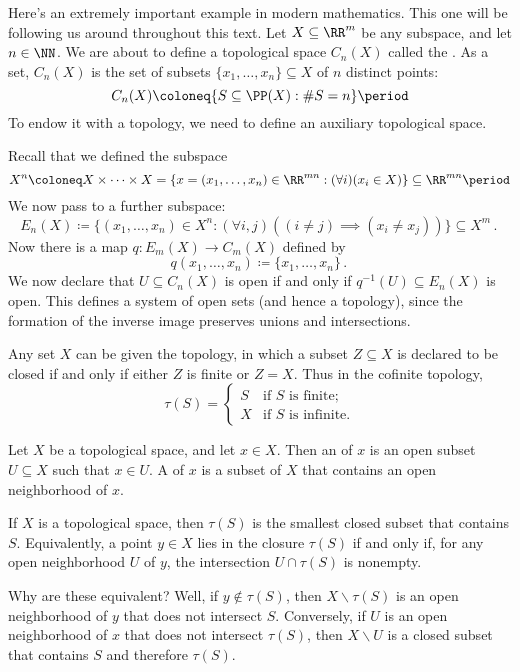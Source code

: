 \begin{exm}
	Here's an extremely important example in modern mathematics.
	This one will be following us around throughout this text.
	Let $X \subseteq \RR^m$ be any subspace, and let $n \in \NN$.
	We are about to define a topological space $C_n(X)$ called the .
	As a set, $C_n(X)$ is the set of subsets $\{x_1,\dots,x_n\} \subseteq X$ of $n$ distinct points:
	\[
		C_n(X) \coloneq \{ S \subseteq \PP(X) : \# S = n \} \period
	\]
	To endow it with a topology, we need to define an auxiliary topological space.

	Recall that we defined the subspace
	\[
		X^n \coloneq X \times \cdots \times X = \{ x = (x_1, \dots, x_n) \in \RR^{mn} : (\forall i)(x_i \in X) \} \subseteq \RR^{mn} \period
	\]
	We now pass to a further subspace:
	\[
		E_n(X) \coloneq \{(x_1, \dots, x_n) \in X^n : (\forall i,j)((i \neq j) \implies (x_i \neq x_j)) \} \subseteq X^m \period
	\]
	Now there is a map $q \colon  E_m(X) \to C_m(X)$ defined by
	\[
		q(x_1, \dots, x_n) \coloneq \{x_1, \dots, x_n\} \period
	\]
	We now declare that $U \subseteq C_n(X)$ is open if and only if $q^{-1}(U) \subseteq E_n(X) $ is open.
	This defines a system of open sets (and hence a topology), since the formation of the inverse image preserves unions and intersections.
\end{exm}

\begin{exm} Any set $X$ can be given the  topology, in which a subset $Z\subseteq X$ is declared to be closed if and only if either $Z$ is finite or $Z=X$.
	Thus in the cofinite topology,
	\[
		\tau(S) = \begin{cases}
			S & \text{if } S \text{ is finite;} \\
			X & \text{if } S \text{ is infinite.}
		\end{cases}
	\]
\end{exm}

\begin{dfn}
	Let $X$ be a topological space, and let $x \in X$.
	Then an  of $x$ is an open subset $U \subseteq X $ such that $x \in U$.
	A  of $x$ is a subset of $X$ that contains an open neighborhood of $x$.
\end{dfn}

\begin{nul}
	If $X$ is a topological space, then $\tau(S)$ is the smallest closed subset that contains $S$.
	Equivalently, a point $y \in X$ lies in the closure $\tau(S)$ if and only if, for any open neighborhood $U$ of $y$, the intersection $U \cap \tau(S)$ is nonempty.

	Why are these equivalent?
	Well, if $y \notin \tau(S)$, then $X \smallsetminus \tau(S)$ is an open neighborhood of $y$ that does not intersect $S$.
	Conversely, if $U$ is an open neighborhood of $x$ that does not intersect $ \tau(S) $, then $X \smallsetminus U$ is a closed subset that contains $S$ and therefore $\tau(S)$.
\end{nul}
